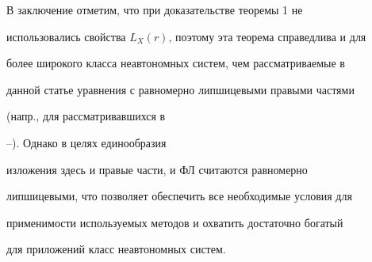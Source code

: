 В заключение отметим, что при доказательстве теоремы 1 не 


использовались свойства $L_X(r)$, поэтому эта теорема справедлива и для 


более широкого класса неавтономных систем, чем рассматриваемые в 


данной статье уравнения с равномерно липшицевыми правыми частями 


(напр., для рассматривавшихся в 


\cite{And}--\cite{Art2}). Однако в целях единообразия 


изложения здесь и правые части, и ФЛ считаются равномерно 


липшицевыми, что позволяет обеспечить все необходимые условия для 


применимости используемых методов и охватить достаточно богатый 


для приложений класс неавтономных систем. 


 


 


